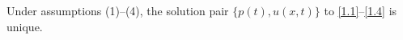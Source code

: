 \documentclass[reqno]{amsart}
\begin{document}




\begin{theorem}\label{thm:uniqueness}
Under assumptions (1)--(4), the solution pair $\{p(t), u(x,t)\}$ to \eqref{1.1}--\eqref{1.4} is unique.
\end{theorem}
\end{document}
